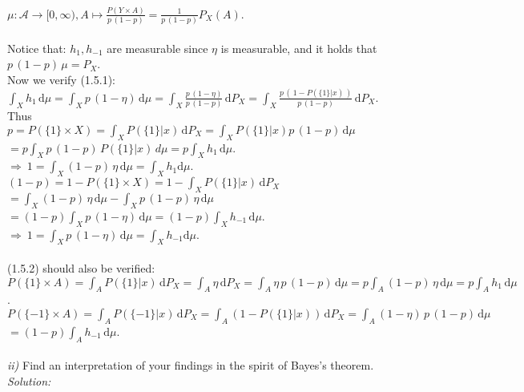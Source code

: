 \documentclass{article}
\begin{document}
\vspace*{-1em} \\
\indent $\mu : \mathcal{A} \rightarrow [0,\infty) , A \mapsto \displaystyle{ \frac{P(Y\times A)}{p\, (1-p)} = \frac{1}{p\, (1-p)} P_X(A) }$.\\
\vspace*{-1.3em} \\
Notice that:  $h_1, h_{-1}$ are measurable since $\eta$ is measurable, and it holds that $p\, (1-p)\, \mu = P_X$. \\
Now we verify (1.5.1): \\
\indent $\displaystyle{ \int_X h_1 \, \text{d}\mu = \int_X p\, (1-\eta) \, \text{d}\mu = \int_X \frac{p\, (1-\eta)}{p\, (1-p)} \, \text{d}P_X = \int_X \frac{p\, (\,1-P(\{1\}|x)\,)}{p\, (1-p)} \, \text{d}P_X  }$.\\
Thus\\
\indent $ \displaystyle{  p = P(\{1\}\times X) = \int_X P(\{1\}|x) \, \text{d}P_X = \int_X P(\{1\}|x) p\,(1-p) \, \text{d}\mu} $\\
\hspace*{6.1cm} $\displaystyle{ = p \int_X p\,(1-p) \, P(\{1\}|x) \, d\mu = p\int_X h_1 \, \text{d} \mu  }$.\\
\indent $\Rightarrow \  \displaystyle{  1 = \int_X (1-p)\, \eta \, \text{d} \mu = \int_X h_1 \text{d} \mu }$.\\
\indent $ \displaystyle{  (1-p) = 1- P(\{1\}\times X) = 1- \int_X P(\{1\}|x) \, \text{d}P_X } $\\
\hspace*{4.5cm} $\displaystyle{ = \int_X (1-p)\,\eta \, \text{d} \mu - \int_X p\, (1-p)\,\eta \, \text{d} \mu   }$\\
\hspace*{4.5cm} $\displaystyle{ = (1-p) \int_X p\,(1-\eta) \, \text{d} \mu = (1-p) \int_X h_{-1} \, \text{d} \mu }$.\\
\indent $\Rightarrow \  \displaystyle{  1 = \int_X p\, (1-\eta)\,\text{d} \mu = \int_X h_{-1} \text{d} \mu }$.\\
\vspace*{-1em} \\
(1.5.2) should also be verified: \\
\indent $ P( \{1\} \times A ) = \displaystyle{ \int_A P(\{1\} | x )\, \text{d}  P_X = \int_A \eta \, \text{d} P_X = \int_A \eta\, p\, (1-p)\, \text{d} \mu = p\int_A (1-p)\, \eta \, \text{d} \mu = p \int_A h_1\, \text{d} \mu  } $.\\
\indent $ P( \{-1\} \times A ) = \displaystyle{ \int_A P(\{-1\} | x )\, \text{d}  P_X = \int_A (1-P(\{1\} | x )  ) \, \text{d} P_X = \int_A (1- \eta)\, p\, (1-p)\, \text{d} \mu  } $\\
\hspace*{9.9cm}$\displaystyle{ = (1-p)\int_A h_{-1} \, \text{d} \mu   }$.\\
\\
\textsl{ii)} Find an interpretation of your findings in the spirit of Bayes's theorem. \\
\textsl{Solution:} \\
\end{document}
